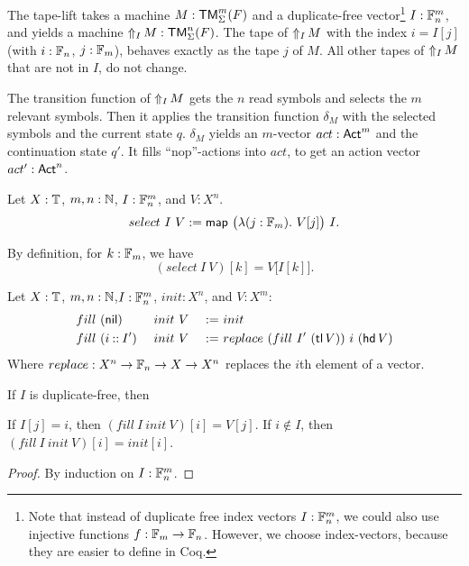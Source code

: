 The tape-lift takes a machine $M:\TM_\Sigma^m(F)$ and a duplicate-free vector\footnote{ Note that instead of duplicate free index vectors
  $I:\Fin_n^m$, we could also use injective functions $f: \Fin_m \to \Fin_n$.  However, we choose index-vectors, because they are easier to define in
  Coq.}  $I: \Fin_n^m$, and yields a machine $\LiftTapes{M}{I} : \TM_\Sigma^n(F)$.  The tape of $\LiftTapes{M}{I}$ with the index $i = I[j]$ (with
$i:\Fin_n$, $j:\Fin_m$), behaves exactly as the tape $j$ of $M$. All other tapes of $\LiftTapes{M}{I}$ that are not in $I$, do not change.


The transition function of $\LiftTapes{M}{I}$ gets the $n$ read symbols and selects the $m$ relevant symbols.  Then it applies the transition function
$\delta_M$ with the selected symbols and the current state $q$.  $\delta_M$ yields an $m$-vector $act:\Act^m$ and the continuation state $q'$.  It
fills ``nop''-actions into $act$, to get an action vector $act':\Act^n$.

\begin{definition}
  \label{def:select}
  Let $X:\Type$, $m,n:\Nat$, $I : \Fin_n^m$, and $V : X^n$.
  \[ select~I~V := \map{\bigl(\lambda (j:\Fin_m).~V[j] \bigr)}{I}. \]
\end{definition}
\begin{lemma}
  By definition, for $k:\Fin_m$, we have
  \[
    (select~I~V)[k]=V\bigl[I[k]\bigr].
  \]
\end{lemma}

\begin{definition}
  Let $X:\Type$, $m,n:\Nat$,$I:\Fin_n^m$, $init:X^n$, and $V:X^m$:
  \begin{alignat*}{3}
    & fill~(\nil      )&& ~init~V &~:=~& init \\
    & fill~(i \cons I')&& ~init~V &~:=~& replace~(fill~I'~(\tl V))~i~(\hd V)
  \end{alignat*}
  Where $replace : X^n \to \Fin_n \to X \to X^n$ replaces the $i$th element of a vector.
\end{definition}
\begin{lemma}
  If $I$ is duplicate-free, then
  \begin{enumerate}
   \label{lem:fill_correct_nth}
    If $I[j]=i$, then $(fill~I~init~V)[i] = V[j]$.
   \label{lem:fill_not_index}
    If $i \notin I$, then $(fill~I~init~V)[i] = init[i]$.
  \end{enumerate}
\end{lemma}
\begin{proof}
  By induction on $I : \Fin_n^m$.
\end{proof}

